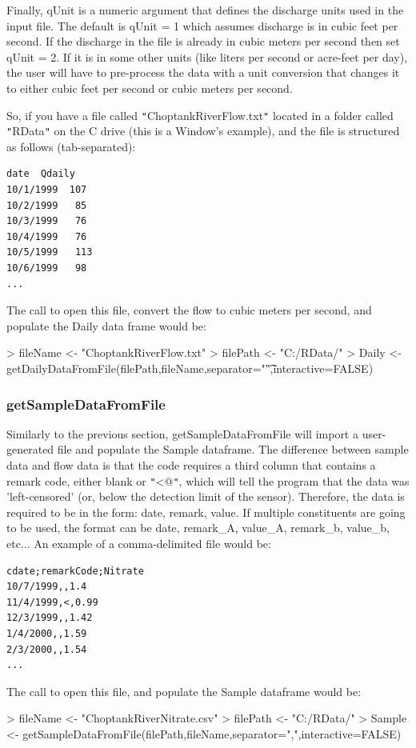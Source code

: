 \documentclass[a4paper,11pt]{article}
\begin{document}
Finally, qUnit is a numeric argument that defines the discharge units used in the input file.  The default is qUnit = 1 which assumes discharge is in cubic feet per second.  If the discharge in the file is already in cubic meters per second then set qUnit = 2.  If it is in some other units (like liters per second or acre-feet per day), the user will have to pre-process the data with a unit conversion that changes it to either cubic feet per second or cubic meters per second.

So, if you have a file called \texttt{"}ChoptankRiverFlow.txt\texttt{"} located in a folder called \texttt{"}RData\texttt{"} on the C drive (this is a Window's example), and the file is structured as follows (tab-separated):
\begin{verbatim}
date  Qdaily
10/1/1999  107
10/2/1999	85
10/3/1999	76
10/4/1999	76
10/5/1999	113
10/6/1999	98
...
\end{verbatim}

The call to open this file, convert the flow to cubic meters per second, and populate the Daily data frame would be:
\begin{Schunk}
\begin{Sinput}
> fileName <- "ChoptankRiverFlow.txt"
> filePath <-  "C:/RData/"
> Daily <- getDailyDataFromFile(filePath,fileName,separator="\t",interactive=FALSE)
\end{Sinput}
\end{Schunk}

\FloatBarrier
\subsubsection{getSampleDataFromFile}
Similarly to the previous section, getSampleDataFromFile will import a user-generated file and populate the Sample dataframe. The difference between sample data and flow data is that the code requires a third column that contains a remark code, either blank or \texttt{"}\verb@<@\texttt{"}, which will tell the program that the data was 'left-censored' (or, below the detection limit of the sensor). Therefore, the data is required to be in the form: date, remark, value.  If multiple constituents are going to be used, the format can be date, remark\_A, value\_A, remark\_b, value\_b, etc... An example of a comma-delimited file would be:

\begin{verbatim}
cdate;remarkCode;Nitrate
10/7/1999,,1.4
11/4/1999,<,0.99
12/3/1999,,1.42
1/4/2000,,1.59
2/3/2000,,1.54
...
\end{verbatim}
The call to open this file, and populate the Sample dataframe would be:
\begin{Schunk}
\begin{Sinput}
> fileName <- "ChoptankRiverNitrate.csv"
> filePath <-  "C:/RData/"
> Sample <- getSampleDataFromFile(filePath,fileName,separator=",",interactive=FALSE)
\end{Sinput}
\end{Schunk}
\end{document}
